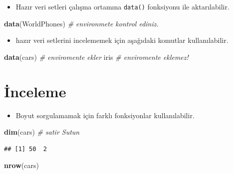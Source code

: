 \documentclass[
  oneside]{book}
\newenvironment{Shaded}{\begin{snugshade}}{\end{snugshade}}
\newcommand{\CommentTok}[1]{\textcolor[rgb]{0.56,0.35,0.01}{\textit{#1}}}
\newcommand{\FunctionTok}[1]{\textcolor[rgb]{0.13,0.29,0.53}{\textbf{#1}}}
\newcommand{\NormalTok}[1]{#1}
\providecommand{\tightlist}{%
  \setlength{\itemsep}{0pt}\setlength{\parskip}{0pt}}
\begin{document}
\begin{itemize}
\tightlist
\item
  Hazır veri setleri çalışma ortamına \texttt{data()} fonksiyonu ile aktarılabilir.
\end{itemize}

\begin{Shaded}
\begin{Highlighting}[]
\FunctionTok{data}\NormalTok{(WorldPhones) }\CommentTok{\# environmete kontrol ediniz. }
\end{Highlighting}
\end{Shaded}

\begin{itemize}
\tightlist
\item
  hazır veri setlerini incelememek için aşağıdaki komutlar kullanılabilir.
\end{itemize}

\begin{Shaded}
\begin{Highlighting}[]
\FunctionTok{data}\NormalTok{(cars) }\CommentTok{\# enviromente ekler}
\NormalTok{iris      }\CommentTok{\# enviromente eklemez!}
\end{Highlighting}
\end{Shaded}

\hypertarget{inceleme}{%
\section{İnceleme}\label{inceleme}}

\begin{itemize}
\tightlist
\item
  Boyut sorgulamamak için farklı fonksiyonlar kullanılabilir.
\end{itemize}

\begin{Shaded}
\begin{Highlighting}[]
\FunctionTok{dim}\NormalTok{(cars) }\CommentTok{\# satir Sutun}
\end{Highlighting}
\end{Shaded}

\begin{verbatim}
## [1] 50  2
\end{verbatim}

\begin{Shaded}
\begin{Highlighting}[]
\FunctionTok{nrow}\NormalTok{(cars)}
\end{Highlighting}
\end{Shaded}
\end{document}
